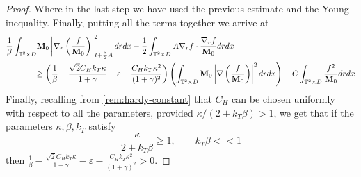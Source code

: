 \documentclass[a4paper,12pt, reqno]{amsart}
\newcommand{\T}{\mathbb{T}}
\newcommand{\M}{\mathbf{M}}
\renewcommand{\k}{\kappa}
\begin{document}
\begin{proof}
Where in the last step we have used the previous estimate and the Young inequality. 
Finally, putting all the terms together we arrive at 
\begin{align}
\frac{1}{\beta}\int_{\T^2 \times D} &\M_0 \left| \nabla_r \left(\frac{f}{\M_0}\right)\right|_{I+ \frac{\beta}{2}A}^2 drdx - \frac{1}{2}\int_{\T^2 \times D} A \nabla_r f \cdot \frac{\nabla_r f}{\M_0}drdx \notag\\
&{\ge \left(\frac{1}{\beta} - \frac{\sqrt{2} C_Hk_T \k}{1+\gamma} -\varepsilon -  \frac{C_Hk_T \k^2}{(1+\gamma)^2}\right) \left(\int_{\T^2 \times D} \M_0 \left|\nabla\left(\frac{f}{\M_0}\right)\right|^2drdx\right) - C\int_{\T^2 \times D} \frac{f^2}{\M_0}drdx}
\end{align}
Finally, recalling from \autoref{rem:hardy-constant} that $C_H$ can be chosen uniformly with respect to all the parameters, provided $ \k/{(2+k_T \beta)} > 1$, we get that if the parameters $\kappa, \beta, k_T$ satisfy 
\begin{equation}\label{restriction-param}
    \frac{\k}{2+k_T \beta} \ge 1, \qquad k_T\beta << 1 
\end{equation}
then {$ \frac{1}{\beta} - \frac{\sqrt{2} C_Hk_T \k}{1+\gamma} -\varepsilon -  \frac{ C_Hk_T \k^2}{(1+\gamma)^2}>0$.}
         \end{proof}
\end{document}
